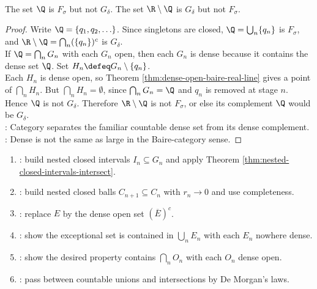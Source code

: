 \begin{corollary} \label{cor:rationals-not-gdelta-irrationals-not-fsigma} \\
The set $\Q$ is $F_\sigma$ but not $G_\delta$. The set $\R\setminus\Q$ is $G_\delta$ but not $F_\sigma$.
\begin{proof}
Write $\Q=\{q_1,q_2,\ldots\}$. Since singletons are closed, $\Q=\bigcup_n\{q_n\}$ is $F_\sigma$, and $\R\setminus\Q=\bigcap_n(\{q_n\})^c$ is $G_\delta$.\\
If $\Q=\bigcap_nG_n$ with each $G_n$ open, then each $G_n$ is dense because it contains the dense set $\Q$. Set $H_n\defeq G_n\setminus\{q_n\}$.\\
Each $H_n$ is dense open, so Theorem \ref{thm:dense-open-baire-real-line} gives a point of $\bigcap_nH_n$. But $\bigcap_nH_n=\emptyset$, since $\bigcap_nG_n=\Q$ and $q_n$ is removed at stage $n$. Hence $\Q$ is not $G_\delta$. Therefore $\R\setminus\Q$ is not $F_\sigma$, or else its complement $\Q$ would be $G_\delta$.\\
: Category separates the familiar countable dense set from its dense complement.\\
: Dense is not the same as large in the Baire-category sense.
\end{proof}
\end{corollary}

\begin{method} \label{meth:baire-category-proof-patterns} 
\begin{enumerate}[label=(\roman*)]
\setlength{\itemsep}{0pt}
\item {}: build nested closed intervals $I_n\subseteq G_n$ and apply Theorem \ref{thm:nested-closed-intervals-intersect}.
\item {}: build nested closed balls $C_{n+1}\subseteq C_n$ with $r_n\to0$ and use completeness.
\item {}: replace $E$ by the dense open set $(\overline{E})^c$.
\item {}: show the exceptional set is contained in $\bigcup_n E_n$ with each $E_n$ nowhere dense.
\item {}: show the desired property contains $\bigcap_n O_n$ with each $O_n$ dense open.
\item {}: pass between countable unions and intersections by De Morgan's laws.
\end{enumerate}
\end{method}
